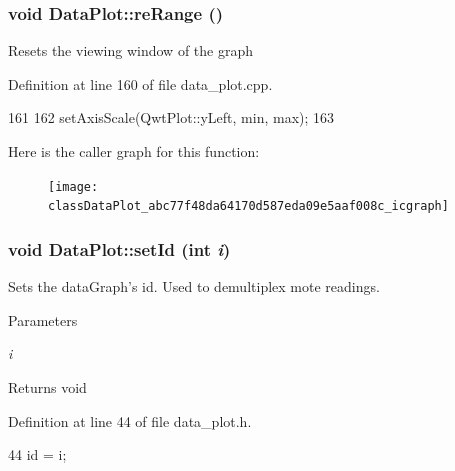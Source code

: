 \hypertarget{classDataPlot_abc77f48da64170d587eda09e5aaf008c}{
\subsubsection[{reRange}]{\setlength{\rightskip}{0pt plus 5cm}void DataPlot::reRange ()}}
\label{classDataPlot_abc77f48da64170d587eda09e5aaf008c}
Resets the viewing window of the graph 

Definition at line 160 of file data\_\-plot.cpp.




\begin{DoxyCode}
161 {
162     setAxisScale(QwtPlot::yLeft, min, max);
163 }
\end{DoxyCode}




Here is the caller graph for this function:\nopagebreak
\begin{figure}[H]
\begin{center}
\leavevmode
\texttt{[image: classDataPlot\_abc77f48da64170d587eda09e5aaf008c\_icgraph]}
\end{center}
\end{figure}


\hypertarget{classDataPlot_ab6af06dfac3585a7dc669ea333a0869d}{
\subsubsection[{setId}]{\setlength{\rightskip}{0pt plus 5cm}void DataPlot::setId (int {\em i})}}
\label{classDataPlot_ab6af06dfac3585a7dc669ea333a0869d}
Sets the dataGraph's id. Used to demultiplex mote readings. 
\begin{DoxyParams}{Parameters}
\item[{\em i}]\end{DoxyParams}
\begin{DoxyReturn}{Returns}
void 
\end{DoxyReturn}


Definition at line 44 of file data\_\-plot.h.




\begin{DoxyCode}
44 { id = i; }
\end{DoxyCode}




